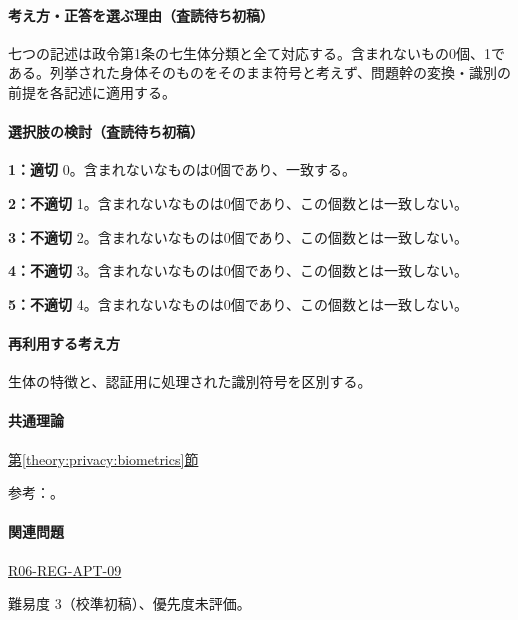 \paragraph{考え方・正答を選ぶ理由（査読待ち初稿）} 七つの記述は政令第1条の七生体分類と全て対応する。含まれないもの0個、1である。列挙された身体そのものをそのまま符号と考えず、問題幹の変換・識別の前提を各記述に適用する。

\paragraph{選択肢の検討（査読待ち初稿）}\mbox{}\par

\noindent\textbf{1：適切} 0。含まれないなものは0個であり、一致する。\par

\noindent\textbf{2：不適切} 1。含まれないなものは0個であり、この個数とは一致しない。\par

\noindent\textbf{3：不適切} 2。含まれないなものは0個であり、この個数とは一致しない。\par

\noindent\textbf{4：不適切} 3。含まれないなものは0個であり、この個数とは一致しない。\par

\noindent\textbf{5：不適切} 4。含まれないなものは0個であり、この個数とは一致しない。\par

\paragraph{再利用する考え方} 生体の特徴と、認証用に処理された識別符号を区別する。

\paragraph{共通理論} \hyperref[theory:privacy:biometrics]{第\ref*{theory:privacy:biometrics}節}

\par 参考：\cite{privacy_general}。

\paragraph{関連問題} \hyperref[q:r06-reg-apt-09]{R06-REG-APT-09}

\par 難易度 3（校準初稿）、優先度未評価。

